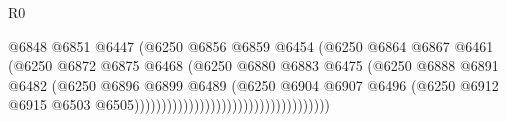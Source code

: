 \begin{lexlean}{R0}
\begin{coremodule}
                                                            @6848
                                                            @6851
                                                            @6447
                                                            (@6250
                                                              @6856
                                                              @6859
                                                              @6454
                                                              (@6250
                                                                @6864
                                                                @6867
                                                                @6461
                                                                (@6250
                                                                  @6872
                                                                  @6875
                                                                  @6468
                                                                  (@6250
                                                                    @6880
                                                                    @6883
                                                                    @6475
                                                                    (@6250
                                                                      @6888
                                                                      @6891
                                                                      @6482
                                                                      (@6250
                                                                        @6896
                                                                        @6899
                                                                        @6489
                                                                        (@6250
                                                                          @6904
                                                                          @6907
                                                                          @6496
                                                                          (@6250
                                                                            @6912
                                                                            @6915
                                                                            @6503
                                                                            @6505))))))))))))))))))))))))))))))))))))

\end{coremodule}
\end{lexlean}
